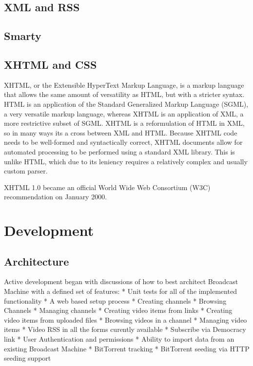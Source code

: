 \documentclass[a4paper,12pt]{report}
\begin{document}
\begin{description}
\section{XML and RSS}


\section{Smarty}


\section{XHTML and CSS}
XHTML, or the Extensible HyperText Markup Language, is a markup language that allows the same amount of versatility as HTML, but with a stricter syntax. 
HTML is an application of the Standard Generalized Markup Language (SGML), a very versatile markup language, whereas XHTML is an application of XML, a more restrictive subset of SGML. 
XHTML is a reformulation of HTML in XML, so in many ways its a cross between XML and HTML. 
Because XHTML code needs to be well-formed and syntactically correct, XHTML documents allow for automated processing to be performed using a standard XML library. 
This is unlike HTML, which due to its leniency requires a relatively complex and usually custom parser. 

XHTML 1.0 became an official World Wide Web Consortium (W3C) recommendation on January 2000. 


\chapter{Development}

\section{Architecture}
Active development began with discussions of how to best architect Broadcast Machine with a defined set of features:
  * Unit tests for all of the implemented functionality
  * A web based setup process
  * Creating channels
  * Browsing Channels
  * Managing channels
  * Creating video items from links
  * Creating video items from uploaded files
  * Browsing videos in a channel
  * Managing video items
  * Video RSS in all the forms curently available
  * Subscribe via Democracy link
  * User Authentication and permissions
  * Ability to import data from an existing Broadcast Machine
  * BitTorrent tracking
  * BitTorrent seeding via HTTP seeding support


\end{description}
\end{document}
